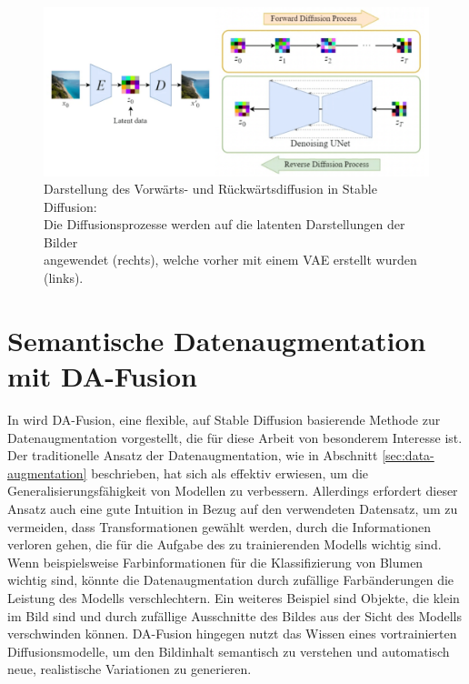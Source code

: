 \begin{figure}[h]
	\centering
	\includegraphics[width=\textwidth]{figure_stable-diffusion_merged.png}
	\caption{Darstellung des Vorwärts- und Rückwärtsdiffusion in Stable Diffusion:\\
		Die	Diffusionsprozesse werden auf die latenten Darstellungen der Bilder\\
		angewendet (rechts), welche vorher mit einem VAE erstellt wurden (links).}
	\label{fig:stable-diffusion}
\end{figure}

\section{Semantische Datenaugmentation mit DA-Fusion} \label{sec:da-fusion}

In \parencite{Trabucco2023dafusion} wird DA-Fusion, eine flexible, auf Stable Diffusion basierende Methode zur Datenaugmentation vorgestellt, die für diese Arbeit von besonderem Interesse ist. Der traditionelle Ansatz der Datenaugmentation, wie in Abschnitt \ref{sec:data-augmentation} beschrieben, hat sich als effektiv erwiesen, um die Generalisierungsfähigkeit von Modellen zu verbessern. Allerdings erfordert dieser Ansatz auch eine gute Intuition in Bezug auf den verwendeten Datensatz, um zu vermeiden, dass Transformationen gewählt werden, durch die Informationen verloren gehen, die für die Aufgabe des zu trainierenden Modells wichtig sind. Wenn beispielsweise Farbinformationen für die Klassifizierung von Blumen wichtig sind, könnte die Datenaugmentation durch zufällige Farbänderungen die Leistung des Modells verschlechtern. Ein weiteres Beispiel sind Objekte, die klein im Bild sind und durch zufällige Ausschnitte des Bildes aus der Sicht des Modells verschwinden können. DA-Fusion hingegen nutzt das Wissen eines vortrainierten Diffusionsmodelle, um den Bildinhalt semantisch zu verstehen und automatisch neue, realistische Variationen zu generieren.

